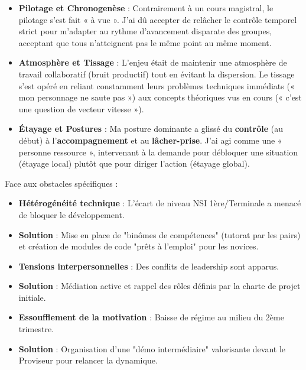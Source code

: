 \begin{itemize}[leftmargin=*]
    \item \textbf{Pilotage et Chronogenèse} : Contrairement à un cours magistral, le pilotage s'est fait « à vue ». J'ai dû accepter de relâcher le contrôle temporel strict pour m'adapter au rythme d'avancement disparate des groupes, acceptant que tous n'atteignent pas le même point au même moment.
    \item \textbf{Atmosphère et Tissage} : L'enjeu était de maintenir une atmosphère de travail collaboratif (bruit productif) tout en évitant la dispersion. Le tissage s'est opéré en reliant constamment leurs problèmes techniques immédiats (« mon personnage ne saute pas ») aux concepts théoriques vus en cours (« c'est une question de vecteur vitesse »).
    \item \textbf{Étayage et Postures} : Ma posture dominante a glissé du \textbf{contrôle} (au début) à l'\textbf{accompagnement} et au \textbf{lâcher-prise}. J'ai agi comme une « personne ressource », intervenant à la demande pour débloquer une situation (étayage local) plutôt que pour diriger l'action (étayage global).
\end{itemize}

Face aux obstacles spécifiques :
\begin{itemize}[leftmargin=*]
    \item \textbf{Hétérogénéité technique} : L'écart de niveau NSI 1ère/Terminale a menacé de bloquer le développement.
    \item \textbf{Solution} : Mise en place de "binômes de compétences" (tutorat par les pairs) et création de modules de code "prêts à l'emploi" pour les novices.
    
    \item \textbf{Tensions interpersonnelles} : Des conflits de leadership sont apparus.
    \item \textbf{Solution} : Médiation active et rappel des rôles définis par la charte de projet initiale.
    
    \item \textbf{Essoufflement de la motivation} : Baisse de régime au milieu du 2ème trimestre.
    \item \textbf{Solution} : Organisation d'une "démo intermédiaire" valorisante devant le Proviseur pour relancer la dynamique.
\end{itemize}

